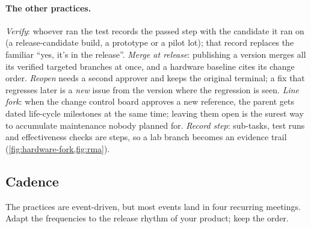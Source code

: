 \paragraph{The other practices.}
\emph{Verify}: whoever ran the test records the passed step with the
candidate it ran on (a release-candidate build, a prototype or a pilot
lot); that record replaces the familiar ``yes, it's in the release''.
\emph{Merge at release}: publishing a version merges all its verified
targeted branches at once, and a hardware baseline cites its change
order. \emph{Reopen} needs a second approver and keeps the original
terminal; a fix that regresses later is a \emph{new} issue from the
version where the regression is seen. \emph{Line fork}: when the change
control board approves a new reference, the parent gets dated life-cycle
milestones at the same time; leaving them open is the surest way to
accumulate maintenance nobody planned for. \emph{Record step}: sub-tasks,
test runs and effectiveness checks are steps, so a lab branch becomes an
evidence trail (\cref{fig:hardware-fork,fig:rma}).

\subsection{Cadence}
\label{subsec:method-cadence}

The practices are event-driven, but most events land in four recurring
meetings. Adapt the frequencies to the release rhythm of your product;
keep the order.

